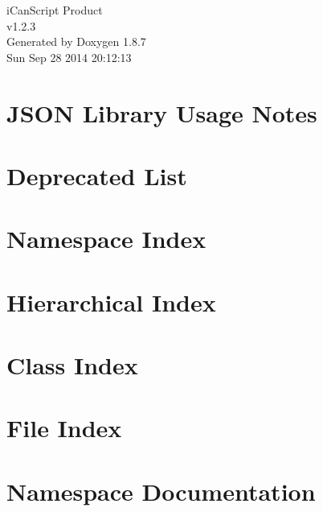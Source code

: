 \documentclass[twoside]{book}
\newcommand{\+}{\discretionary{\mbox{\scriptsize$\hookleftarrow$}}{}{}}
\newcommand{\clearemptydoublepage}{%
  \newpage{\pagestyle{empty}\cleardoublepage}%
}
\begin{document}
\hypersetup{pageanchor=false,
             bookmarks=true,
             bookmarksnumbered=true,
             pdfencoding=unicode
            }
\begin{titlepage}
\vspace*{7cm}
\begin{center}%
{\Large i\+Can\+Script Product \\[1ex]\large v1.\+2.\+3 }\\
\vspace*{1cm}
{\large Generated by Doxygen 1.8.7}\\
\vspace*{0.5cm}
{\small Sun Sep 28 2014 20:12:13}\\
\end{center}
\end{titlepage}
\clearemptydoublepage
\tableofcontents
\clearemptydoublepage
{}
\hypersetup{pageanchor=true}

\chapter{J\+S\+O\+N Library Usage Notes}
\label{md__editor__j_s_o_n__j_s_o_n__library__usage__notes}
\hypertarget{md__editor__j_s_o_n__j_s_o_n__library__usage__notes}{}

\chapter{Deprecated List}
\label{deprecated}
\hypertarget{deprecated}{}

\chapter{Namespace Index}

\chapter{Hierarchical Index}

\chapter{Class Index}

\chapter{File Index}

\chapter{Namespace Documentation}

\end{document}
